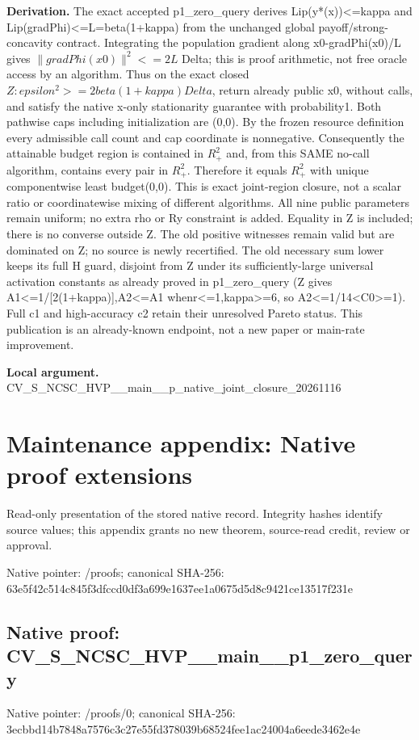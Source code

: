 \documentclass[10pt,a4paper]{article}
\begin{document}
\textbf{Derivation.} The exact accepted p1\_\allowbreak{}zero\_\allowbreak{}query derives Lip(y*(x))<=kappa and Lip(gradPhi)<=L=beta(1+kappa) from the unchanged global payoff/strong-concavity contract. Integrating the population gradient along x0-gradPhi(x0)/L gives $\|gradPhi(x0)\|^2<=2L$ Delta; this is proof arithmetic, not free oracle access by an algorithm. Thus on the exact closed $Z:epsilon^2>=2beta(1+kappa)Delta$, return already public x0, without calls, and satisfy the native x-only stationarity guarantee with probability1. Both pathwise caps including initialization are (0,0). By the frozen resource definition every admissible call count and cap coordinate is nonnegative. Consequently the attainable budget region is contained in $R_+^2$ and, from this SAME no-call algorithm, contains every pair in $R_+^2$. Therefore it equals $R_+^2$ with unique componentwise least budget(0,0). This is exact joint-region closure, not a scalar ratio or coordinatewise mixing of different algorithms. All nine public parameters remain uniform; no extra rho or Ry constraint is added. Equality in Z is included; there is no converse outside Z. The old positive witnesses remain valid but are dominated on Z; no source is newly recertified. The old necessary sum lower keeps its full H guard, disjoint from Z under its sufficiently-large universal activation constants as already proved in p1\_\allowbreak{}zero\_\allowbreak{}query (Z gives A1<=1/[2(1+kappa)],A2<=A1 whenr<=1,kappa>=6, so A2<=1/14<C0>=1). Full c1 and high-accuracy c2 retain their unresolved Pareto status. This publication is an already-known endpoint, not a new paper or main-rate improvement.

\textbf{Local argument.} CV\_\allowbreak{}S\_\allowbreak{}NCSC\_\allowbreak{}HVP\_\allowbreak{}\_\allowbreak{}main\_\allowbreak{}\_\allowbreak{}p\_\allowbreak{}native\_\allowbreak{}joint\_\allowbreak{}closure\_\allowbreak{}20261116

\section{Maintenance appendix: Native proof extensions}
Read-only presentation of the stored native record. Integrity hashes identify source values; this appendix grants no new theorem, source-read credit, review or approval.

Native pointer: /proofs; canonical SHA-256: 63e5f42c514c845f3dfccd0df3a699e1637ee1a0675d5d8c9421ce13517f231e

\subsection{Native proof: CV\_\allowbreak{}S\_\allowbreak{}NCSC\_\allowbreak{}HVP\_\allowbreak{}\_\allowbreak{}main\_\allowbreak{}\_\allowbreak{}p1\_\allowbreak{}zero\_\allowbreak{}query}
Native pointer: /proofs/0; canonical SHA-256: 3ecbbd14b7848a7576c3c27e55fd378039b68524fee1ac24004a6eede3462e4e
\end{document}
